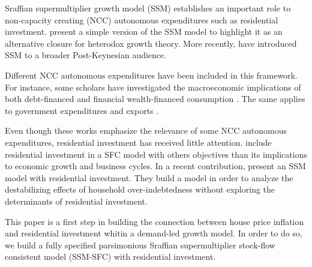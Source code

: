 \documentclass[11pt]{article}
\begin{document}
Sraffian supermultiplier growth model (SSM) establishes an important role to non-capacity creating (NCC) autonomous expenditures such
as residential investment.
\textcite{serrano_long_1995,serrano_sraffian_2017} present a simple version of the SSM model to highlight it as an alternative closure for heterodox growth theory.
More recently, \textcites{allain_tackling_2015}{lavoie_post-keynesian_2015}{lavoie_convergence_2016} have introduced SSM to a broader Post-Keynesian audience.

Different NCC autonomous expenditures have been included in this framework. 
For instance, some scholars have investigated the macroeconomic implications of both debt-financed \cites{pariboni_autonomous_2015}{fagundes_role_2017}{mandarino-2020-worker-debt} and financial wealth-financed consumption \cite{brochier_supermultiplier_2018}.
The same applies to government expenditures \cites{allain_tackling_2015}{bougrine_autonomous_2020} and exports \cite{nah_long-run_2017}.

Even though these works emphasize the relevance of some NCC autonomous expenditures, residential investment has received little attention.
\textcites{zezza_u.s._2008}{nikolaidi_securitisation_2015} include residential investment in a SFC model with others objectives than its implications to economic growth and business cycles.
In a recent contribution, \textcite{dejuan_supermultiplier-cum-finance_2018} present an SSM model with residential investment.
They build a model in order to analyze the destabilizing effects of household over-indebtedness without exploring the determinants of residential investment.

This paper is a first step in building the connection between house price inflation and residential investment whitin a demand-led growth model.
In order to do so, we build a fully specified parsimonious Sraffian supermultiplier stock-flow consistent model (SSM-SFC) with residential investment.
\end{document}
